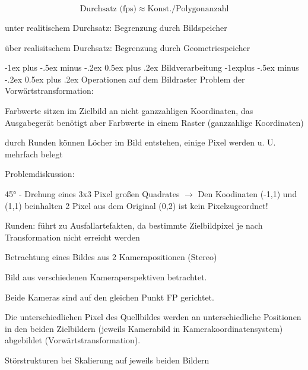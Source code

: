 \documentclass[landscape]{article}
\makeatletter
\renewcommand{\section}{\@startsection{section}{1}{0mm}%
                                {-1ex plus -.5ex minus -.2ex}%
                                {0.5ex plus .2ex}%
                                {\normalfont\large\bfseries}}
\renewcommand{\subsection}{\@startsection{subsection}{2}{0mm}%
                                {-1explus -.5ex minus -.2ex}%
                                {0.5ex plus .2ex}%
                                {\normalfont\normalsize\bfseries}}
\makeatother
\begin{document}
\begin{multicols}{3}
  $$\text{Durchsatz (fps)} \approx \text{Konst.} / \text{Polygonanzahl}$$
  \begin{itemize*}
    \item unter realitischem Durchsatz: Begrenzung durch Bildspeicher
    \item über realisitschem Durchsatz: Begrenzung durch Geometriespeicher
  \end{itemize*}
  
  
  \section{Bildverarbeitung}
  \subsection{Operationen auf dem Bildraster}
  Problem der Vorwärtstransformation:
  \begin{itemize*}
    \item Farbwerte sitzen im Zielbild an nicht ganzzahligen Koordinaten, das Ausgabegerät benötigt aber Farbwerte in einem Raster (ganzzahlige Koordinaten)
    \item durch Runden können Löcher im Bild entstehen, einige Pixel werden u. U. mehrfach belegt
  \end{itemize*}
  
  
  Problemdiskussion: 
  \begin{itemize*}
    \item 45° - Drehung eines 3x3 Pixel großen Quadrates $\rightarrow$ Den Koodinaten (-1,1) und (1,1) beinhalten 2 Pixel aus dem Original (0,2) ist kein Pixelzugeordnet!
    \item Runden: führt zu Ausfallartefakten, da bestimmte Zielbildpixel je nach Transformation nicht erreicht werden
    \item Betrachtung eines Bildes aus 2 Kamerapositionen (Stereo)
          \begin{itemize*}
            \item Bild aus verschiedenen Kameraperspektiven betrachtet.
            \item Beide Kameras sind auf den gleichen Punkt FP gerichtet.
            \item Die unterschiedlichen Pixel des Quellbildes werden an unterschiedliche Positionen in den beiden Zielbildern (jeweils Kamerabild in Kamerakoordinatensystem) abgebildet (Vorwärtstransformation).
            \item Störstrukturen bei Skalierung auf jeweils beiden Bildern
          \end{itemize*}
  \end{itemize*}
  

\end{multicols}
\end{document}
